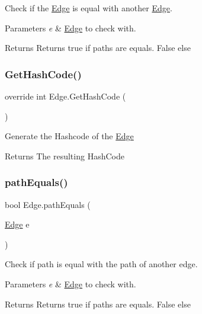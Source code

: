 Check if the \hyperlink{classEdge}{Edge} is equal with another \hyperlink{classEdge}{Edge}. 


\begin{DoxyParams}{Parameters}
{\em e} & \hyperlink{classEdge}{Edge} to check with.\\
\hline
\end{DoxyParams}
\begin{DoxyReturn}{Returns}
Returns true if paths are equals. False else
\end{DoxyReturn}
\mbox{\label{classEdge_a66fbde74247da2afd025b3ff48afaa92}} 
\subsubsection{\texorpdfstring{Get\+Hash\+Code()}{GetHashCode()}}
{\footnotesize\ttfamily override int Edge.\+Get\+Hash\+Code (\begin{DoxyParamCaption}{ }\end{DoxyParamCaption})\hspace{0.3cm}{\ttfamily [inline]}}



Generate the Hashcode of the \hyperlink{classEdge}{Edge} 

\begin{DoxyReturn}{Returns}
The resulting Hash\+Code
\end{DoxyReturn}
\mbox{\label{classEdge_ab070ab636aed7cb54b6cfc71ccdbf9c6}} 
\subsubsection{\texorpdfstring{path\+Equals()}{pathEquals()}}
{\footnotesize\ttfamily bool Edge.\+path\+Equals (\begin{DoxyParamCaption}\item[{\hyperlink{classEdge}{Edge}}]{e }\end{DoxyParamCaption})\hspace{0.3cm}{\ttfamily [inline]}}



Check if path is equal with the path of another edge. 


\begin{DoxyParams}{Parameters}
{\em e} & \hyperlink{classEdge}{Edge} to check with.\\
\hline
\end{DoxyParams}
\begin{DoxyReturn}{Returns}
Returns true if paths are equals. False else
\end{DoxyReturn}
\mbox{\label{classEdge_a4ccf109be5219f74fdb635a73d93ab64}} 
